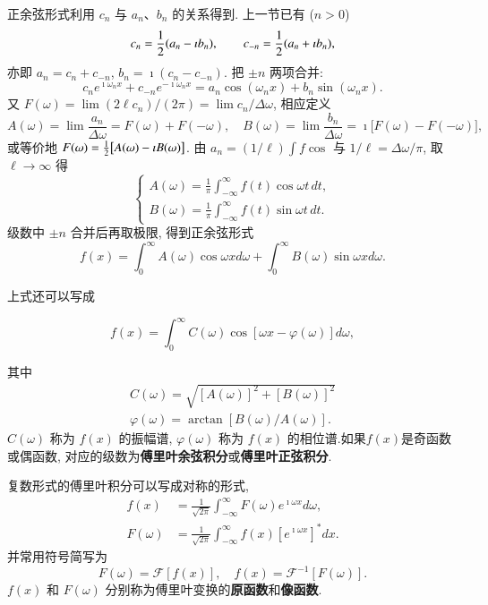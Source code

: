 正余弦形式利用 $c_n$ 与 $a_n$、$b_n$ 的关系得到.
上一节已有 ($n>0$)
\[
  c_n={\frac{1}{2}}(a_n-\imath b_n),
  \qquad
  c_{-n}={\frac{1}{2}}(a_n+\imath b_n),
\]
亦即 $a_n=c_n+c_{-n}$, $b_n=\imath(c_n-c_{-n})$.
把 $\pm n$ 两项合并:
\[
  c_n e^{\imath\omega_n x}+c_{-n}e^{-\imath\omega_n x}
  =a_n\cos(\omega_n x)+b_n\sin(\omega_n x).
\]
又 $F(\omega)=\lim(2\ell c_n)/(2\pi)=\lim c_n/\Delta\omega$, 相应定义
\[
  A(\omega)=\lim\frac{a_n}{\Delta\omega}=F(\omega)+F(-\omega),
  \quad
  B(\omega)=\lim\frac{b_n}{\Delta\omega}=\imath\bigl[F(\omega)-F(-\omega)\bigr],
\]
或等价地 $F(\omega)={\frac{1}{2}}\bigl[A(\omega)-\imath B(\omega)\bigr]$.
由 $a_n=(1/\ell)\int f\cos$ 与 $1/\ell=\Delta\omega/\pi$, 取 $\ell\to\infty$ 得
\begin{equation}
    \left\{\begin{array}{l}
    A(\omega)=\frac{1}{\pi} \int_{-\infty}^{\infty} f(t) \cos \omega t\, d t, \\
    B(\omega)=\frac{1}{\pi} \int_{-\infty}^{\infty} f(t) \sin \omega t\, d t .
    \end{array}\right.
\end{equation}
级数中 $\pm n$ 合并后再取极限, 得到正余弦形式
\begin{equation}
    f(x) =\int_{0}^{\infty} A(\omega) \cos {\omega x} d\omega + \int_{0}^{\infty} B(\omega) \sin {\omega x} d\omega.
\end{equation}

上式还可以写成

\begin{equation}
    f(x)=\int_0^{\infty} C(\omega) \cos [\omega x-\varphi(\omega)] d \omega,
\end{equation}

其中
$$
\begin{gathered}
C(\omega)=\sqrt{[A(\omega)]^2+[B(\omega)]^2} \\
\varphi(\omega)=\arctan [B(\omega) / A(\omega)] .
\end{gathered}
$$
$C(\omega)$ 称为 $f(x)$ 的振幅谱, $\varphi(\omega)$ 称为 $f(x)$ 的相位谱.如果$f(x)$是奇函数或偶函数,
对应的级数为\textbf{傅里叶余弦积分}或\textbf{傅里叶正弦积分}.

复数形式的傅里叶积分可以写成对称的形式,
\begin{equation}
    \begin{aligned}
    f(x) & =\frac{1}{\sqrt{2 \pi}} \int_{-\infty}^{\infty} F(\omega)e^{\imath \omega x} d \omega, \\
    F(\omega) & =\frac{1}{\sqrt{2 \pi}} \int_{-\infty}^{\infty} f(x)\left[e^{\imath \omega x}\right]^* d x .
    \end{aligned}
\end{equation}
并常用符号简写为
$$
F(\omega)=\mathcal{F}[f(x)], \quad f(x)=\mathcal{F}^{-1}[F(\omega)] .
$$
$f(x)$ 和 $F(\omega)$ 分别称为傅里叶变换的\textbf{原函数}和\textbf{像函数}.

